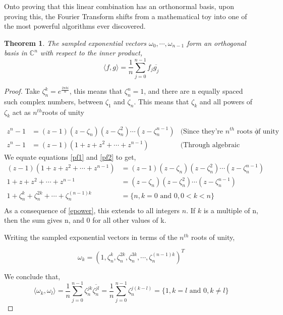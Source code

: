 \documentclass[11pt]{amsart}
\newtheorem{thm}{Theorem}[section]
\theoremstyle{definition}
\theoremstyle{remark}
\numberwithin{equation}{section}
\begin{document}
Onto proving that this linear combination has an orthonormal basis, upon proving this, the Fourier Transform shifts from a mathematical toy into one of the most powerful algorithms ever discovered.
\begin{thm} \label{orthonormalbasis}
	The sampled exponential vectors $\omega_0, \cdots , \omega_{n-1}$ form an orthogonal basis in $\mathbb{C}^n$ with respect to the inner product,
	\[
		\langle f,g \rangle = \frac{1}{n} \sum_{j=0}^{n-1} f_j \overline{g_j}
	\]
\end{thm}
\begin{proof}
Take $\zeta_n^k = e^{\frac{2\pi k i}{n}}$, this means that $\zeta^n_n = 1$, and there are n equally spaced such complex numbers, between $\zeta_1$ and $\zeta_n$. This means that $\zeta_k$ and all powers of $\zeta_k$ act as $n^{th} $roots of unity

	\begin{align}
		z^{n}-1 &= (z-1)(z -  \zeta_n)(z-\zeta_n^2)\cdots(z - \zeta_n^{n-1}) &\text{(Since they're $n^{th}$ roots of unity})  \label{pf1} \\
		z^n-1 &= (z-1)(1 + z + z^2 + \cdots + z^{n-1}) &\text{(Through algebraic factorization)} \label{pf2}
	\end{align}
	We equate equations \ref{pf1} and \ref{pf2} to get,
	\begin{align*}
	(z-1)(1 + z + z^2 + \cdots + z^{n-1})  &= (z-1)(z -  \zeta_n)(z-\zeta_n^2)\cdots(z - \zeta_n^{n-1}) \\
	1 + z + z^2 + \cdots + z^{n-1}  &= (z -  \zeta_n)(z-\zeta_n^2)\cdots(z - \zeta_n^{n-1}) \\
		1 + \zeta_n^k + \zeta_n^{2k} + \cdots + \zeta_n^{(n-1) k} &= \{n,k = 0 \text{ and } 0, 0 < k < n \} \\
	\end{align*}
As a consequence of \ref{epower}, this extends to all integers $n$. If $k$ is a multiple of n, then the sum gives n, and 0 for all other values of k.

Writing the sampled exponential vectors in terms of the $n^{th}$ roots of unity,

\[
	\omega_k = (1, \zeta_n^k, \zeta_n^{2k},\zeta_n^{3k}, \cdots, \zeta_n^{(n-1)k})^T
\]

We conclude that, 
\[
	\langle	\omega_k, \omega_l \rangle = \frac{1}{n} \sum_{j=0}^{n-1} \zeta_{n}^{jk} \overline{\zeta_{n}^{jl}} = \frac{1}{n} \sum_{j=0}^{n-1} \zeta_n^{j(k-l)} = \{1, k = l \text{ and } 0, k \neq l\}
\]
\end{proof}
\end{document}

